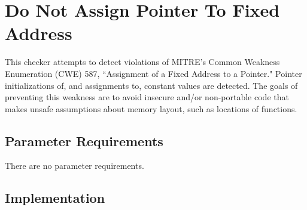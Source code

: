 %
%

\section{Do Not Assign Pointer To Fixed Address}
\label{DoNotAssignPointerToFixedAddress::overview}

This checker attempts to detect violations of MITRE's Common Weakness
Enumeration (CWE) 587, ``Assignment of a Fixed Address to a Pointer."  Pointer
initializations of, and assignments to, constant values are detected.  The goals
of preventing this weakness are to avoid insecure and/or non-portable code that
makes unsafe assumptions about memory layout, such as locations of functions.


\subsection{Parameter Requirements}

There are no parameter requirements.


\subsection{Implementation}


